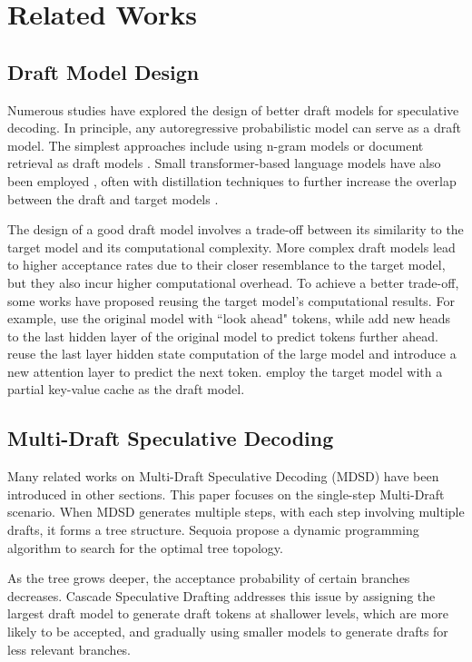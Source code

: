 \section{Related Works}
\label{se:related_work}
\subsection{Draft Model Design}
Numerous studies have explored the design of better draft models for speculative decoding. In principle, any autoregressive probabilistic model can serve as a draft model. The simplest approaches include using n-gram models \citep{ou2024lossless} or document retrieval as draft models \citep{yang2023inference,he2023rest}. Small transformer-based language models have also been employed \citep{leviathan2023fast,chen2023accelerating}, often with distillation techniques to further increase the overlap between the draft and target models \citep{zhou2023distillspec}.


The design of a good draft model involves a trade-off between its similarity to the target model and its computational complexity. More complex draft models lead to higher acceptance rates due to their closer resemblance to the target model, but they also incur higher computational overhead. To achieve a better trade-off, some works have proposed reusing the target model's computational results. For example, \citet{monea2023pass} use the original model with ``look ahead" tokens, while \citet{cai2024medusa} add new heads to the last hidden layer of the original model to predict tokens further ahead. \citet{li2024eagle} reuse the last layer hidden state computation of the large model and introduce a new attention layer to predict the next token. \citet{sun2024triforce} employ the target model with a partial key-value cache as the draft model.


\subsection{Multi-Draft Speculative Decoding}\label{sec:related_mdsd}
Many related works on Multi-Draft Speculative Decoding (MDSD) have been introduced in other sections. This paper focuses on the single-step Multi-Draft scenario. When MDSD generates multiple steps, with each step involving multiple drafts, it forms a tree structure. Sequoia \citep{chen2024sequoia} propose a dynamic programming algorithm to search for the optimal tree topology.

As the tree grows deeper, the acceptance probability of certain branches decreases. Cascade Speculative Drafting \citep{chen2023cascade} addresses this issue by assigning the largest draft model to generate draft tokens at shallower levels, which are more likely to be accepted, and gradually using smaller models to generate drafts for less relevant branches.

